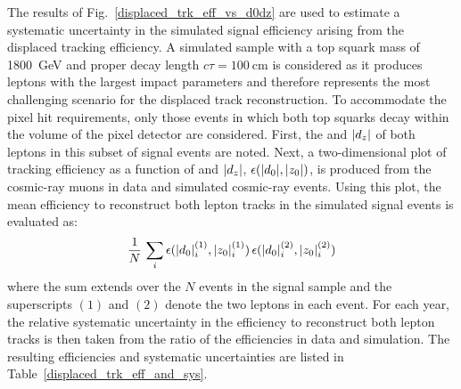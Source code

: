 The results of Fig.~\ref{displaced_trk_eff_vs_d0dz} are used to estimate a systematic uncertainty in the simulated signal efficiency arising from the displaced tracking efficiency. A simulated \stoptolb sample with a top squark mass of \SI{1800}{\GeV} and proper decay length $c\tau = \SI{100}{\cm}$ is considered as it produces leptons with the largest impact parameters and therefore represents the most challenging scenario for the displaced track reconstruction. To accommodate the pixel hit requirements, only those events in which both top squarks decay within the volume of the pixel detector are considered. First, the \ad and $\lvert d_z \rvert$ of both leptons in this subset of signal events are noted. Next, a two-dimensional plot of tracking efficiency as a function of \ad and $\lvert d_z \rvert$, $\epsilon(\lvert d_0 \rvert, \lvert z_0 \rvert)$, is produced from the cosmic-ray muons in data and simulated cosmic-ray events. Using this plot, the mean efficiency to reconstruct both lepton tracks in the simulated signal events is evaluated as:
\begin{equation}
    \frac{1}{N}\,\sum_i\epsilon(\lvert d_0 \rvert^{(1)}_i, \lvert z_0 \rvert^{(1)}_i)\, \epsilon(\lvert d_0 \rvert^{(2)}_i, \lvert z_0 \rvert^{(2)}_i)
\end{equation}
where the sum extends over the $N$ events in the signal sample and the superscripts
$(1)$ and $(2)$ denote the two leptons in each event. For each year, the relative systematic uncertainty in the efficiency to reconstruct both lepton tracks is then taken from the ratio of the efficiencies in data and simulation. The resulting efficiencies and systematic uncertainties are listed in Table~\ref{displaced_trk_eff_and_sys}.

